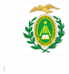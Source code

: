 

\thispagestyle{empty}

\begin{figure}
    \centering
    \includegraphics[width=2.25cm, height=2.68cm]{lib/brasao_ufrn.jpg}
\end{figure}

\begin{center}
    \large{\imprimirinstituicao}
    
    
    \large{\MakeUppercase{\imprimirtitulo: \imprimirsubtitulo}}
    
    
    \large{\MakeUppercase{\textbf{\imprimirautor}}}
    
    
    \large{\imprimirlocal} \\
    \large{\imprimirdata}
\end{center}

\newpage
